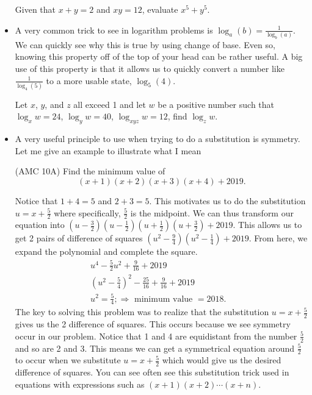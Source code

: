 \documentclass[11pt]{article}
\begin{document}
\begin{itemize}
    \begin{exercise}
    Given that $x+y=2$ and $xy=12$, evaluate $x^5+y^5$.
    \end{exercise}
    \item A very common trick to see in logarithm problems is $\log_a(b) = \frac{1}{\log_b(a)}$. We can quickly see why this is true by using change of base. Even so, knowing this property off of the top of your head can be rather useful. A big use of this property is that it allows
    us to quickly convert a number like $\frac{1}{\log_4(5)}$ to a more usable state, $\log_5(4)$.
    \begin{exercise}
    Let $x$, $y$, and $z$ all exceed 1 and let $w$ be a positive number such that $\log_x w = 24$, $\log_y w = 40$, $\log_{xyz} w = 12$, find $\log_z w$.
    \end{exercise}
\item A very useful principle to use when trying to do a substitution is symmetry. Let me give an example to illustrate what I mean
    \begin{example}(AMC 10A)
        Find the minimum value of 
        \[
            (x+1)(x+2)(x+3)(x+4)+2019.
        \]
    \end{example}
    Notice that $1+4=5$ and $2+3=5$. This motivates us to do the substitution $u=x+\frac{5}{2}$ where specifically, $\frac{5}{2}$ is the midpoint. We can thus transform our equation into 
    $(u-\frac{3}{2})(u-\frac{1}{2})(u+\frac{1}{2})(u+\frac{3}{2}) + 2019$. This allows us to get 2 pairs of difference of squares $(u^2-\frac{9}{4})(u^2-\frac{1}{4})+2019$. From here, we expand the polynomial and complete the square.
    \begin{equation*}
        \begin{aligned}
             u^4 - \frac{5}{2}u^2 + \frac{9}{16} + 2019  & \\
             (u^2-\frac{5}{4})^2 - \frac{25}{16} + \frac{9}{16} + 2019  & \\
            u^2 = \frac{5}{4}; \Longrightarrow \text{ minimum value } = 2018.
        \end{aligned}
    \end{equation*}
    The key to solving this problem was to realize that the substitution $u = x+\frac{5}{2}$ gives us the 2 difference of squares. This occurs because we see symmetry occur in our problem. Notice that 1 and 4 are equidistant from the number $\frac{5}{2}$ and so are 2 and 3. This means we can
    get a symmetrical equation around $\frac{5}{2}$ to occur when we substitute $u=x+\frac{5}{2}$ which would give us the desired difference of squares. You can see often see this substitution trick used in equations with expressions such as $(x+1)(x+2) \cdots (x+n)$.


\end{itemize}
\end{document}
